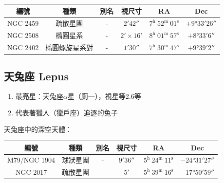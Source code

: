 \begin{center}
\begin{longtable}{c | c | c | c | c | c}
    編號 & 種類 & 別名 & 視尺寸 & RA & Dec \\
    \hline
    \endfirsthead


    \endfoot

    \endlastfoot

    NGC 2459 & 疏散星團 & - & \(\ang{;2;42}\) & \(7^\text{h }52^\text{m }01^\text{s}\) & \(+\ang{9;33;26}\) \\
    NGC 2508 & 橢圓星系 & - & \(\ang{;2;}\times\ang{;16;}\) & \(8^\text{h }01^\text{m }57^\text{s}\) & \(+\ang{8;33;6}\) \\
    NGC 2402 & 橢圓螺旋星系對 & - & \(\ang{;1;30}\) & \(7^\text{h }30^\text{m }47^\text{s}\) & \(+\ang{9;39;2}\)

\end{longtable}
\end{center}

\subsection{天兔座 Lepus}
\begin{enumerate}
    \item 最亮星：天兔座\(\alpha\)星（廁一），視星等2.6等
    \item 代表著獵人（獵戶座）追逐的兔子
\end{enumerate}
天兔座中的深空天體：

\begin{center}
\begin{longtable}{c | c | c | c | c | c}
    編號 & 種類 & 別名 & 視尺寸 & RA & Dec \\
    \hline
    \endfirsthead


    \endfoot

    \endlastfoot

    M79/NGC 1904 & 球狀星團 & - & \(\ang{;9;36}\) & \(5^\text{h }24^\text{m }11^\text{s}\) & \(-\ang{24;31;27}\) \\
    NGC 2017 & 疏散星團 & - & \(\ang{;5;}\) & \(5^\text{h }39^\text{m }16^\text{s}\) & \(-\ang{17;50;59}\) 
\end{longtable}
\end{center}

